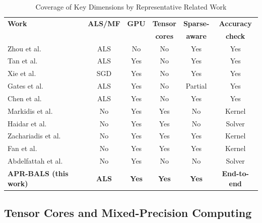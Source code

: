 \begin{table}[!t]
\caption{Coverage of Key Dimensions by Representative Related Work}
\label{tab:litgap}
\centering
\footnotesize
\renewcommand{\arraystretch}{1.15}
\setlength{\tabcolsep}{2.2pt}
\begin{tabular}{lccccc}
\toprule
\textbf{Work} & \textbf{ALS/MF} & \textbf{GPU} & \textbf{Tensor} & \textbf{Sparse-} & \textbf{Accuracy} \\
 & & & \textbf{cores} & \textbf{aware} & \textbf{check} \\
\midrule
Zhou et al.~\cite{zhou2008largescale}            & ALS    & No  & No  & Yes & Yes \\
Tan et al.~\cite{tan2016faster}                  & ALS    & Yes & No  & Yes & Yes \\
Xie et al.~\cite{xie2017cumf}                    & SGD    & Yes & No  & Yes & Yes \\
Gates et al.~\cite{gates2015accelerating}        & ALS    & Yes & No  & Partial & Yes \\
Chen et al.~\cite{chen2021bals}                  & ALS    & Yes & No  & Yes & Yes \\
Markidis et al.~\cite{markidis2018nvidia}        & No     & Yes & Yes & No  & Kernel \\
Haidar et al.~\cite{haidar2018harnessing}        & No     & Yes & Yes & No  & Solver \\
Zachariadis et al.~\cite{zachariadis2020accelerating} & No & Yes & Yes & Yes & Kernel \\
Fan et al.~\cite{fan2024dtcspmm}                 & No     & Yes & Yes & Yes & Kernel \\
Abdelfattah et al.~\cite{abdelfattah2017factorization} & No & Yes & No & No & Solver \\
\midrule
\textbf{APR-BALS (this work)} & \textbf{ALS} & \textbf{Yes} & \textbf{Yes} & \textbf{Yes} & \textbf{End-to-end} \\
\bottomrule
\end{tabular}
\end{table}

\subsection{Tensor Cores and Mixed-Precision Computing}

